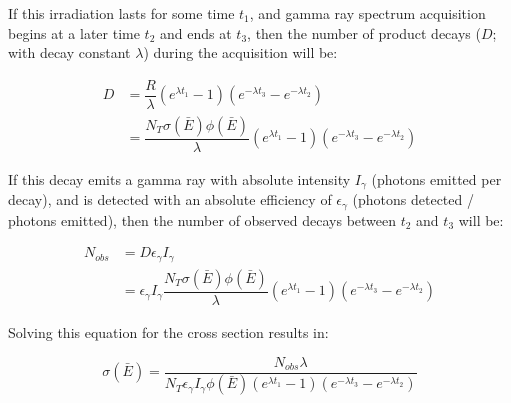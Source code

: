 \documentclass[5p]{elsarticle}
\newcommand{\pp}[1]{\left( #1\right)}
\begin{document}
If this irradiation lasts for  some time $t_1$, and gamma ray spectrum acquisition begins at a later time $t_2$ and ends at  $t_3$, then the number of product decays ($D$; with decay constant $\lambda$) during the acquisition will be:



\begin{equation}
\begin{aligned}
D &= \dfrac{R}{\lambda}\pp{e^{\lambda t_1}-1}\pp{e^{-\lambda t_3} - e^{-\lambda t_2}}
\\
&= \dfrac{N_T \sigma\pp{\bar{E}} \phi\pp{\bar{E}} }{\lambda}\pp{e^{\lambda t_1}-1}\pp{e^{-\lambda t_3} - e^{-\lambda t_2}} 
\end{aligned}
\end{equation}

If this decay emits a gamma ray with absolute intensity $I_\gamma$ (photons emitted per decay), and is detected with an absolute efficiency  of $\epsilon_\gamma$ (photons detected / photons emitted), then the number of observed decays between $t_2$ and $t_3$ will be:


 

\begin{align}
N_{obs} &= D \epsilon_\gamma I_\gamma \\
&=  \epsilon_\gamma I_\gamma  \dfrac{N_T \sigma\pp{\bar{E}} \phi\pp{\bar{E}} }{\lambda}\pp{e^{\lambda t_1}-1}\pp{e^{-\lambda t_3} - e^{-\lambda t_2}} \nonumber
\end{align}

Solving this equation for the  cross section results in:

\begin{equation}\label{eqn:single_xs_eqn}
\sigma\pp{\bar{E}} = \dfrac{N_{obs}\lambda}{N_T \epsilon_\gamma I_\gamma  \phi\pp{\bar{E}}  \pp{e^{\lambda t_1}-1}\pp{e^{-\lambda t_3} - e^{-\lambda t_2}}}
\end{equation}
\end{document}
